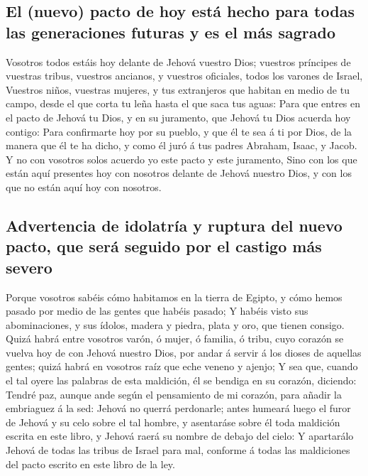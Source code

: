 \hypertarget{el-nuevo-pacto-de-hoy-estuxe1-hecho-para-todas-las-generaciones-futuras-y-es-el-muxe1s-sagrado}{%
\subsection{El (nuevo) pacto de hoy está hecho para todas las
generaciones futuras y es el más
sagrado}\label{el-nuevo-pacto-de-hoy-estuxe1-hecho-para-todas-las-generaciones-futuras-y-es-el-muxe1s-sagrado}}

 Vosotros todos estáis hoy delante de Jehová vuestro Dios;
vuestros príncipes de vuestras tribus, vuestros ancianos, y vuestros
oficiales, todos los varones de Israel,  Vuestros niños,
vuestras mujeres, y tus extranjeros que habitan en medio de tu campo,
desde el que corta tu leña hasta el que saca tus aguas: 
Para que entres en el pacto de Jehová tu Dios, y en su juramento, que
Jehová tu Dios acuerda hoy contigo:  Para confirmarte hoy
por su pueblo, y que él te sea á ti por Dios, de la manera que él te ha
dicho, y como él juró á tus padres Abraham, Isaac, y Jacob.
 Y no con vosotros solos acuerdo yo este pacto y este
juramento,  Sino con los que están aquí presentes hoy con
nosotros delante de Jehová nuestro Dios, y con los que no están aquí hoy
con nosotros.

\hypertarget{advertencia-de-idolatruxeda-y-ruptura-del-nuevo-pacto-que-seruxe1-seguido-por-el-castigo-muxe1s-severo}{%
\subsection{Advertencia de idolatría y ruptura del nuevo pacto, que será
seguido por el castigo más
severo}\label{advertencia-de-idolatruxeda-y-ruptura-del-nuevo-pacto-que-seruxe1-seguido-por-el-castigo-muxe1s-severo}}

 Porque vosotros sabéis cómo habitamos en la tierra de
Egipto, y cómo hemos pasado por medio de las gentes que habéis pasado;
 Y habéis visto sus abominaciones, y sus ídolos, madera y
piedra, plata y oro, que tienen consigo.  Quizá habrá entre
vosotros varón, ó mujer, ó familia, ó tribu, cuyo corazón se vuelva hoy
de con Jehová nuestro Dios, por andar á servir á los dioses de aquellas
gentes; quizá habrá en vosotros raíz que eche veneno y ajenjo;
 Y sea que, cuando el tal oyere las palabras de esta
maldición, él se bendiga en su corazón, diciendo: Tendré paz, aunque
ande según el pensamiento de mi corazón, para añadir la embriaguez á la
sed:  Jehová no querrá perdonarle; antes humeará luego el
furor de Jehová y su celo sobre el tal hombre, y asentaráse sobre él
toda maldición escrita en este libro, y Jehová raerá su nombre de debajo
del cielo:  Y apartarálo Jehová de todas las tribus de
Israel para mal, conforme á todas las maldiciones del pacto escrito en
este libro de la ley.

